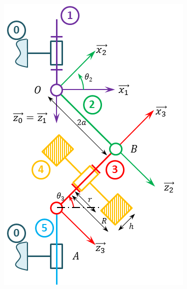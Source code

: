 \documentclass[10pt,fleqn]{article} %
\begin{document}
\begin{multicols}{2}
\begin{center}
\includegraphics[width=\linewidth]{images/Schema_Cin.png}
\end{center}


\ifprof
\else
\end{multicols}
\fi
\end{document}
